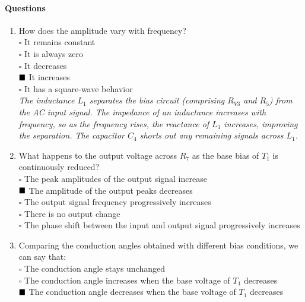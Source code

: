 \documentclass[12pt,a4paper]{article}
\begin{document}
    \paragraph{Questions}
    \begin{enumerate}
        \item How does the amplitude vary with frequency? \\
        \(\square\) It remains constant \\
        \(\square\) It is always zero \\
        \(\square\) It decreases \\
        \(\textcolor{black}{\blacksquare}\) It increases \\
        \(\square\) It has a square-wave behavior \\
        \textit{The inductance $L_1$ separates the bias circuit (comprising $R_{V3}$ and $R_5$) from the AC input signal. The impedance of an inductance increases with frequency, so as the frequency rises, the reactance of $L_1$ increases, improving the separation. The capacitor $C_4$ shorts out any remaining signals across $L_1$.}

        \item What happens to the output voltage across $R_7$ as the base bias of $T_1$ is continuously reduced? \\
        \(\square\) The peak amplitudes of the output signal increase \\
        \(\textcolor{black}{\blacksquare}\) The amplitude of the output peaks decreases \\
        \(\square\) The output signal frequency progressively increases \\
        \(\square\) There is no output change \\
        \(\square\) The phase shift between the input and output signal progressively increases

        \item Comparing the conduction angles obtained with different bias conditions, we can say that: \\
        \(\square\) The conduction angle stays unchanged \\
        \(\square\) The conduction angle increases when the base voltage of $T_1$ decreases \\
        \(\textcolor{black}{\blacksquare}\) The conduction angle decreases when the base voltage of $T_1$ decreases
    \end{enumerate}
\end{document}
